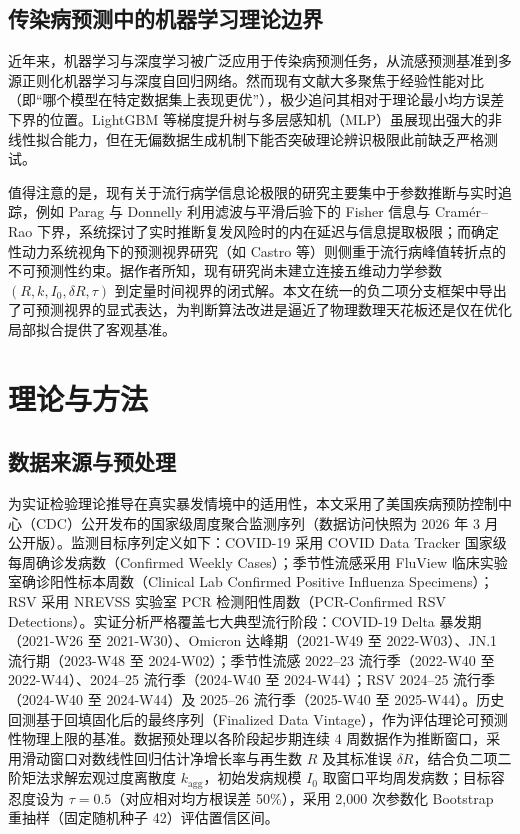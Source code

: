 \documentclass[11pt,a4paper]{article}
\theoremstyle{plain}
\theoremstyle{definition}
\begin{document}
\subsection{传染病预测中的机器学习理论边界}
近年来，机器学习与深度学习被广泛应用于传染病预测任务，从流感预测基准\citep{reich2019collaborative, ray2023comparing}到多源正则化机器学习\citep{colubri2019machine}与深度自回归网络\citep{salinas2020deepar}。然而现有文献大多聚焦于经验性能对比（即“哪个模型在特定数据集上表现更优”），极少追问其相对于理论最小均方误差下界的位置。LightGBM 等梯度提升树\citep{ke2017lightgbm}与多层感知机（MLP）虽展现出强大的非线性拟合能力，但在无偏数据生成机制下能否突破理论辨识极限此前缺乏严格测试。

值得注意的是，现有关于流行病学信息论极限的研究主要集中于参数推断与实时追踪，例如 Parag 与 Donnelly\citep{parag2022fundamental} 利用滤波与平滑后验下的 Fisher 信息与 Cram\'er--Rao 下界，系统探讨了实时推断复发风险时的内在延迟与信息提取极限；而确定性动力系统视角下的预测视界研究（如 Castro 等\citep{castro2020predictability}）则侧重于流行病峰值转折点的不可预测性约束。据作者所知，现有研究尚未建立连接五维动力学参数 $(R, k, I_0, \delta R, \tau)$ 到定量时间视界的闭式解。本文在统一的负二项分支框架中导出了可预测视界的显式表达，为判断算法改进是逼近了物理数理天花板还是仅在优化局部拟合提供了客观基准。

\section{理论与方法}

\subsection{数据来源与预处理}\label{sec:data}
为实证检验理论推导在真实暴发情境中的适用性，本文采用了美国疾病预防控制中心（CDC）公开发布的国家级周度聚合监测序列（数据访问快照为 2026 年 3 月公开版）。监测目标序列定义如下：COVID-19 采用 COVID Data Tracker 国家级每周确诊发病数（Confirmed Weekly Cases）；季节性流感采用 FluView 临床实验室确诊阳性标本周数（Clinical Lab Confirmed Positive Influenza Specimens）；RSV 采用 NREVSS 实验室 PCR 检测阳性周数（PCR-Confirmed RSV Detections）。实证分析严格覆盖七大典型流行阶段：COVID-19 Delta 暴发期（2021-W26 至 2021-W30）、Omicron 达峰期（2021-W49 至 2022-W03）、JN.1 流行期（2023-W48 至 2024-W02）；季节性流感 2022--23 流行季（2022-W40 至 2022-W44）、2024--25 流行季（2024-W40 至 2024-W44）；RSV 2024--25 流行季（2024-W40 至 2024-W44）及 2025--26 流行季（2025-W40 至 2025-W44）。历史回测基于回填固化后的最终序列（Finalized Data Vintage），作为评估理论可预测性物理上限的基准。数据预处理以各阶段起步期连续 4 周数据作为推断窗口，采用滑动窗口对数线性回归估计净增长率与再生数 $R$ 及其标准误 $\delta R$，结合负二项二阶矩法求解宏观过度离散度 $k_{\text{agg}}$，初始发病规模 $I_0$ 取窗口平均周发病数；目标容忍度设为 $\tau = 0.5$（对应相对均方根误差 50\%），采用 2,000 次参数化 Bootstrap 重抽样（固定随机种子 42）评估置信区间。
\end{document}
